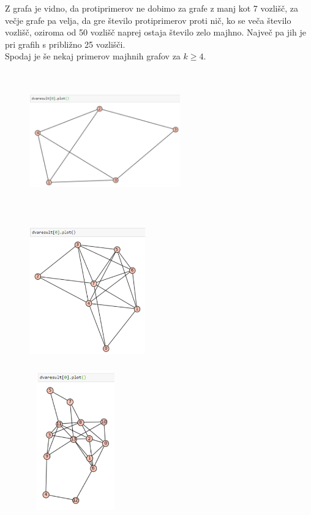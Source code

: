 \documentclass[a4paper]{article}
\begin{document}
Z grafa je vidno, da protiprimerov ne dobimo za grafe z manj kot 7 vozlišč, za večje grafe pa velja, da gre število protiprimerov proti nič, ko se veča število vozlišč, oziroma od 50 vozlišč naprej ostaja število zelo majhno. Največ pa jih je pri grafih s približno 25 vozlišči.\\
Spodaj je še nekaj primerov majhnih grafov za $k \geq 4$.
\begin{figure}[h!]
    \centering
    \includegraphics[width=6.5cm, height=6cm]{Slika10}
    \label{fig:mesh1}
\end{figure}

\begin{figure}[h!]
    \centering
    \includegraphics[width=5cm, height=6cm]{Slika9}
    \label{fig:mesh1}
\end{figure}

\begin{figure}[h!]
    \centering
    \includegraphics[width=4cm, height=6cm]{Slika14}
    \label{fig:mesh1}
\end{figure}
\end{document}
